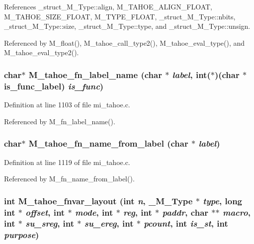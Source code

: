 References \_\-struct\_\-M\_\-Type::align, M\_\-TAHOE\_\-ALIGN\_\-FLOAT, M\_\-TAHOE\_\-SIZE\_\-FLOAT, M\_\-TYPE\_\-FLOAT, \_\-struct\_\-M\_\-Type::nbits, \_\-struct\_\-M\_\-Type::size, \_\-struct\_\-M\_\-Type::type, and \_\-struct\_\-M\_\-Type::unsign.

Referenced by M\_\-float(), M\_\-tahoe\_\-call\_\-type2(), M\_\-tahoe\_\-eval\_\-type(), and M\_\-tahoe\_\-eval\_\-type2().
\subsubsection{\setlength{\rightskip}{0pt plus 5cm}char$\ast$ M\_\-tahoe\_\-fn\_\-label\_\-name (char $\ast$ {\em label}, int($\ast$)(char $\ast$is\_\-func\_\-label) {\em is\_\-func})}\label{m__tahoe_8h_01d1fd9ed229f1ab0d78531f1cf54613}




Definition at line 1103 of file mi\_\-tahoe.c.

Referenced by M\_\-fn\_\-label\_\-name().
\subsubsection{\setlength{\rightskip}{0pt plus 5cm}char$\ast$ M\_\-tahoe\_\-fn\_\-name\_\-from\_\-label (char $\ast$ {\em label})}\label{m__tahoe_8h_b6ece8a15107246baaedc05def0addc8}




Definition at line 1119 of file mi\_\-tahoe.c.

Referenced by M\_\-fn\_\-name\_\-from\_\-label().
\subsubsection{\setlength{\rightskip}{0pt plus 5cm}int M\_\-tahoe\_\-fnvar\_\-layout (int {\em n}, \bf{\_\-M\_\-Type} $\ast$ {\em type}, long int $\ast$ {\em offset}, int $\ast$ {\em mode}, int $\ast$ {\em reg}, int $\ast$ {\em paddr}, char $\ast$$\ast$ {\em macro}, int $\ast$ {\em su\_\-sreg}, int $\ast$ {\em su\_\-ereg}, int $\ast$ {\em pcount}, int {\em is\_\-st}, int {\em purpose})}\label{m__tahoe_8h_aee428d5fa060639ff8dc30d577b7d28}




